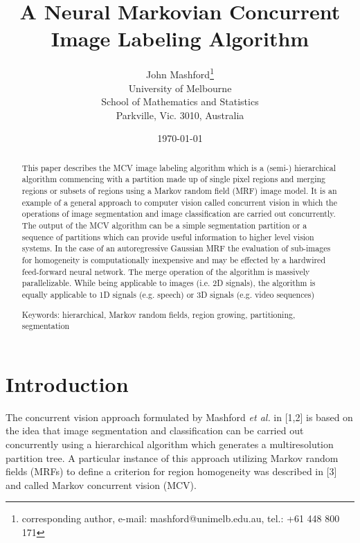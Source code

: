 \documentclass[12pt,twoside]{article}
\begin{document}
\title{\bf A Neural Markovian Concurrent Image Labeling Algorithm}
\author{John Mashford\footnote{corresponding author, e-mail: mashford@unimelb.edu.au, tel.: +61 448 800 171}  \\
University of Melbourne \\
School of Mathematics and Statistics \\
Parkville, Vic. 3010, Australia}
\date{\today}
\maketitle

\begin{abstract}

This paper describes the MCV image labeling algorithm which is a (semi-) hierarchical algorithm commencing with a
partition made up of single pixel regions and merging regions or subsets of regions using a Markov random field (MRF) image
model. It is an example of a general approach to computer vision called concurrent vision in which the operations of image
segmentation and image classification are carried out concurrently. The output of the MCV algorithm can be a simple
segmentation partition or a sequence of partitions which can provide useful information to higher level vision systems. In the
case of an autoregressive Gaussian MRF the evaluation of sub-images for homogeneity is computationally inexpensive and
may be effected by a hardwired feed-forward neural network. The merge operation of the algorithm is massively parallelizable. While being applicable to images (i.e. 2D signals), the algorithm is equally applicable to 1D signals (e.g. speech) or 3D signals (e.g. video sequences)

Keywords: hierarchical, Markov random fields, region growing, partitioning, segmentation

\end{abstract}

\section{Introduction}

The concurrent vision approach formulated by Mashford {\em et al.} in [1,2] is based on the idea
that image segmentation and classification can be carried out concurrently using a hierarchical
algorithm which generates a multiresolution partition tree. A particular instance of this
approach utilizing Markov random fields (MRFs) to define a criterion for region homogeneity
was described in [3] and called Markov concurrent vision (MCV).
\end{document}
